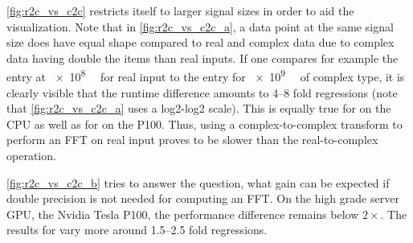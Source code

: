 \cref{fig:r2c_vs_c2c} restricts itself to larger signal sizes in order to aid the visualization. Note that in \cref{fig:r2c_vs_c2c_a}, a data point at the same signal size does have equal shape compared to real and complex data due to complex data having double the items than real inputs. If one compares for example the entry at \SI[exponent-base=2]{e8}{\mebi\byte} for real input to the entry for \SI[exponent-base=2]{e9}{\mebi\byte} of complex type, it is clearly visible that the runtime difference amounts to \numrange{4}{8} fold regressions (note that \cref{fig:r2c_vs_c2c_a} uses a log2-log2 scale). This is equally true for \fftw{} on the CPU as well as for \cufft{} on the P100. Thus, using a complex-to-complex transform to perform an FFT on real input proves to be slower than the real-to-complex operation.

\cref{fig:r2c_vs_c2c_b} tries to answer the question, what gain can be expected if double precision is not needed for computing an FFT. On the high grade server GPU, the Nvidia Tesla P100, the performance difference remains below $2{\times}$. The results for \fftw{} vary more around \numrange{1.5}{2.5} fold regressions. 




